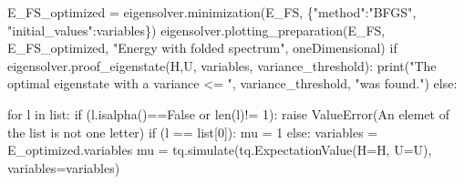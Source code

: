\documentclass[
  letterpaper,
  DIV=11,
  numbers=noendperiod]{scrartcl}
\newenvironment{Shaded}{\begin{snugshade}}{\end{snugshade}}
\newcommand{\BuiltInTok}[1]{\textcolor[rgb]{0.00,0.23,0.31}{#1}}
\newcommand{\ControlFlowTok}[1]{\textcolor[rgb]{0.00,0.23,0.31}{#1}}
\newcommand{\DecValTok}[1]{\textcolor[rgb]{0.68,0.00,0.00}{#1}}
\newcommand{\KeywordTok}[1]{\textcolor[rgb]{0.00,0.23,0.31}{#1}}
\newcommand{\NormalTok}[1]{\textcolor[rgb]{0.00,0.23,0.31}{#1}}
\newcommand{\OperatorTok}[1]{\textcolor[rgb]{0.37,0.37,0.37}{#1}}
\newcommand{\PreprocessorTok}[1]{\textcolor[rgb]{0.68,0.00,0.00}{#1}}
\newcommand{\StringTok}[1]{\textcolor[rgb]{0.13,0.47,0.30}{#1}}
\newcommand{\VariableTok}[1]{\textcolor[rgb]{0.07,0.07,0.07}{#1}}
\begin{document}
\begin{Shaded}
\begin{Highlighting}[]
\NormalTok{        E\_FS\_optimized }\OperatorTok{=}\NormalTok{ eigensolver.minimization(E\_FS, \{}\StringTok{"method"}\NormalTok{:}\StringTok{"BFGS"}\NormalTok{, }\StringTok{"initial\_values"}\NormalTok{:variables\})}
\NormalTok{        eigensolver.plotting\_preparation(E\_FS, E\_FS\_optimized, }\StringTok{"Energy with folded spectrum"}\NormalTok{, oneDimensional)}
        \ControlFlowTok{if}\NormalTok{ eigensolver.proof\_eigenstate(H,U, variables, variance\_threshold):}
                \BuiltInTok{print}\NormalTok{(}\StringTok{"The optimal eigenstate with a variance \textless{}= "}\NormalTok{, variance\_threshold, }\StringTok{"was found."}\NormalTok{)}
    \ControlFlowTok{else}\NormalTok{:}
        
        \ControlFlowTok{for}\NormalTok{ l }\KeywordTok{in} \BuiltInTok{list}\NormalTok{:}
            \ControlFlowTok{if}\NormalTok{ (l.isalpha()}\OperatorTok{==}\VariableTok{False} \KeywordTok{or} \BuiltInTok{len}\NormalTok{(l)}\OperatorTok{!=} \DecValTok{1}\NormalTok{):}
                \ControlFlowTok{raise} \PreprocessorTok{ValueError}\NormalTok{(}\StringTok{\textquotesingle{}An elemet of the list is not one letter\textquotesingle{}}\NormalTok{)}
            \ControlFlowTok{if}\NormalTok{ (l }\OperatorTok{==} \BuiltInTok{list}\NormalTok{[}\DecValTok{0}\NormalTok{]):}
\NormalTok{                mu }\OperatorTok{=} \DecValTok{1}
            \ControlFlowTok{else}\NormalTok{:}
\NormalTok{                variables }\OperatorTok{=}\NormalTok{ E\_optimized.variables}
\NormalTok{                mu }\OperatorTok{=}\NormalTok{ tq.simulate(tq.ExpectationValue(H}\OperatorTok{=}\NormalTok{H, U}\OperatorTok{=}\NormalTok{U), variables}\OperatorTok{=}\NormalTok{variables)}


\end{Highlighting}
\end{Shaded}
\end{document}
